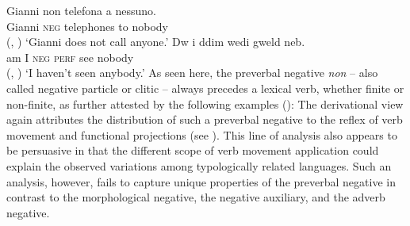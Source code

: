 \documentclass[output=paper
	        ,collection
	        ,collectionchapter
 	        ,biblatex
                ,babelshorthands
                ,newtxmath
                ,draftmode
                ,colorlinks, citecolor=brown
]{langscibook}
\begin{document}
\begin{exe}
\begin{xlist}
\eal
\ex \label{negation-position-1a}
\gll Gianni non telefona a nessuno.\\
     Gianni \textsc{neg} telephones to nobody\\ \hfill (, \citealt[]{Borsley:06})
\glt`Gianni does not call anyone.'
\ex \label{negation-position-1c}
\gll Dw i ddim wedi gweld neb.\\
     am I \textsc{neg} \textsc{perf} see nobody\\ \hfill  (, \citealt[]{Borsley:05})
\glt `I haven't seen anybody.'
\zl
%
%
As seen here,
the  preverbal negative \textit{non} -- also called negative particle or
clitic -- always precedes a lexical  verb, whether finite or
non-finite, as further attested by the following
examples (\citealp[Chapter~4]{Kim:00}):
%
\eal
{}
%
%
\zl
%
%
The derivational view again attributes the distribution of such
a preverbal negative to the reflex of verb movement and functional
projections (see \citealt[Chapter~1]{Belletti:90}). This line of analysis also appears to be persuasive
in that the different scope of verb movement application could explain
the observed variations among typologically related
languages. Such an analysis, however,
  fails to capture unique properties of the preverbal negative
  in contrast to the morphological negative, the negative auxiliary, and the adverb negative.


\end{xlist}
\end{exe}
\end{document}
